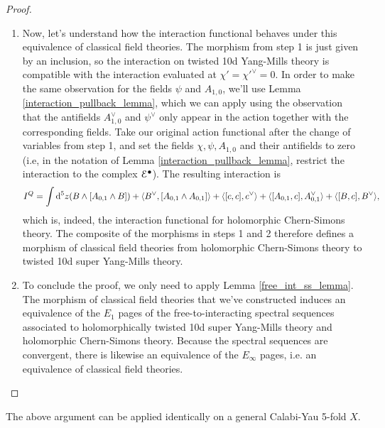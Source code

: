 \documentclass[10pt, oneside]{article}
\begin{document}
\begin{proof}
\begin{enumerate}
 \item Now, let's understand how the interaction functional behaves under this equivalence of classical field theories.  The morphism from step 1 is just given by an inclusion, so the interaction on twisted 10d Yang-Mills theory is compatible with the interaction evaluated at $\chi'=\chi'^\vee=0$.  In order to make the same observation for the fields $\psi$ and $A_{1,0}$, we'll use Lemma \ref{interaction_pullback_lemma}, which we can apply using the observation that the antifields $A_{1,0}^\vee$ and $\psi^\vee$ only appear in the action together with the corresponding fields.  Take our original action functional after the change of variables from step 1, and set the fields $\chi, \psi, A_{1,0}$ and their antifields to zero (i.e, in the notation of Lemma \ref{interaction_pullback_lemma}, restrict the interaction to the complex $\mathcal{E}^\bullet$).  The resulting interaction is 
 \[
  I^Q = \int {\rm d}^5z (B \wedge [A_{0,1} \wedge B]) + \langle B^\vee, [A_{0,1} \wedge A_{0,1}] \rangle + \langle [c,c], c^\vee \rangle + \langle [A_{0,1}, c], A_{0,1}^\vee \rangle + \langle [B,c], B^\vee \rangle,
 \]
 which is, indeed, the interaction functional for holomorphic Chern-Simons theory.  The composite of the morphisms in steps 1 and 2 therefore defines a morphism of classical field theories from holomorphic Chern-Simons theory to twisted 10d super Yang-Mills theory.
 
 \item To conclude the proof, we only need to apply Lemma \ref{free_int_ss_lemma}.  The morphism of classical field theories that we've constructed induces an equivalence of the $E_1$ pages of the free-to-interacting spectral sequences associated to holomorphically twisted 10d super Yang-Mills theory and holomorphic Chern-Simons theory.  Because the spectral sequences are convergent, there is likewise an equivalence of the $E_\infty$ pages, i.e. an equivalence of classical field theories.
\end{enumerate}
\end{proof}

The above argument can be applied identically on a general Calabi-Yau 5-fold $X$.
 
\end{document}
